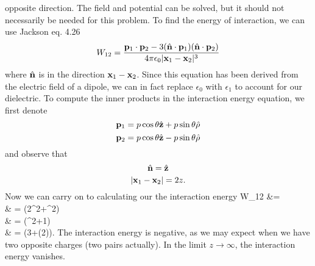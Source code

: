 \documentclass[11pt,letterpaper]{article}
\begin{document}
	opposite direction. The field and potential can be solved, but it should not necessarily be needed for this problem. To find
	the energy of interaction, we can use Jackson eq. 4.26
	\[
		W_{12}= \frac{\mathbf{p}_1\cdot \mathbf{p}_2 - 3(\hat{\mathbf{n}}\cdot \mathbf{p}_1)(\hat{\mathbf{n}}\cdot \mathbf{p}_2)}
		{4\pi\epsilon_0|\mathbf{x}_1-\mathbf{x}_2|^3}
	\]
	where $\hat{\mathbf{n}}$ is in the direction $\mathbf{x}_1-\mathbf{x}_2$. Since this equation has been derived from the electric
	field of a dipole, we can in fact replace $\epsilon_0$ with $\epsilon_1$ to account for our dielectric. To compute the inner 
	products in the interaction energy equation, we first denote 
	\[ 
		\mathbf{p}_1 = p\cos\theta \hat{\mathbf{z}} + p\sin\theta \hat{\mathbf{\rho}}
	\]
	\[ 
		\mathbf{p}_2 = p\cos\theta \hat{\mathbf{z}}  -p\sin\theta \hat{\mathbf{\rho}}
	\]
	and observe that
	\[
		\hat{\mathbf{n}}= \hat{\mathbf{z}}
	\]
	\[
		|\mathbf{x}_1-\mathbf{x}_2| = 2z.
	\]
	Now we can carry on to calculating our the interaction energy
	\ba
		W_{12} &= \\
		& = (2\cos^2\theta+\sin^2\theta)\\
		& =  (\cos^2\theta+1)\\
		& = (3+\cos(2\theta)).
	\ea
	The interaction energy is negative, as we may expect when we have two opposite charges (two pairs actually). In the limit 
	$z\to\infty$, the interaction energy vanishes. 
\eenum
\end{document}
